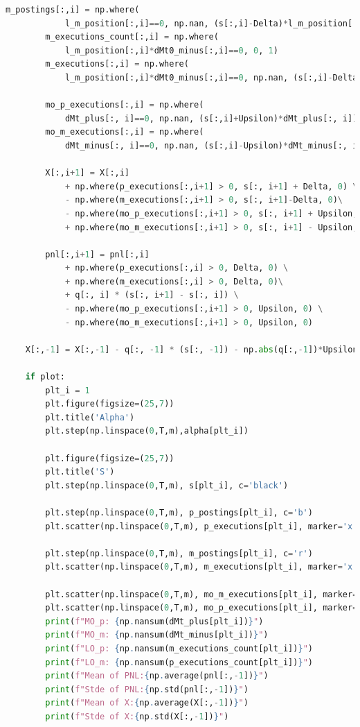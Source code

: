 \documentclass[12pt,a4paper,spanish]{article}%
\begin{document}
\begin{appendices}
\begin{lstlisting}[language=Python]
        m_postings[:,i] = np.where(
        	l_m_position[:,i]==0, np.nan, (s[:,i]-Delta)*l_m_position[:,i])
        m_executions_count[:,i] = np.where(
        	l_m_position[:,i]*dMt0_minus[:,i]==0, 0, 1)
        m_executions[:,i] = np.where(
        	l_m_position[:,i]*dMt0_minus[:,i]==0, np.nan, (s[:,i]-Delta)*l_m_position[:,i]*np.where(dMt0_minus[:,i]>0,1,0))

        mo_p_executions[:,i] = np.where(
        	dMt_plus[:, i]==0, np.nan, (s[:,i]+Upsilon)*dMt_plus[:, i])
        mo_m_executions[:,i] = np.where(
        	dMt_minus[:, i]==0, np.nan, (s[:,i]-Upsilon)*dMt_minus[:, i])

        X[:,i+1] = X[:,i] 
        	+ np.where(p_executions[:,i+1] > 0, s[:, i+1] + Delta, 0) \
        	- np.where(m_executions[:,i+1] > 0, s[:, i+1]-Delta, 0)\
            - np.where(mo_p_executions[:,i+1] > 0, s[:, i+1] + Upsilon, 0) \
            + np.where(mo_m_executions[:,i+1] > 0, s[:, i+1] - Upsilon, 0)

        pnl[:,i+1] = pnl[:,i] 
        	+ np.where(p_executions[:,i] > 0, Delta, 0) \
        	+ np.where(m_executions[:,i] > 0, Delta, 0)\
            + q[:, i] * (s[:, i+1] - s[:, i]) \
            - np.where(mo_p_executions[:,i+1] > 0, Upsilon, 0) \
            - np.where(mo_m_executions[:,i+1] > 0, Upsilon, 0)
        
    X[:,-1] = X[:,-1] - q[:, -1] * (s[:, -1]) - np.abs(q[:,-1])*Upsilon

    if plot:
        plt_i = 1
        plt.figure(figsize=(25,7))
        plt.title('Alpha')
        plt.step(np.linspace(0,T,m),alpha[plt_i])

        plt.figure(figsize=(25,7))
        plt.title('S')
        plt.step(np.linspace(0,T,m), s[plt_i], c='black')
        
        plt.step(np.linspace(0,T,m), p_postings[plt_i], c='b')
        plt.scatter(np.linspace(0,T,m), p_executions[plt_i], marker='x', c='b')

        plt.step(np.linspace(0,T,m), m_postings[plt_i], c='r')
        plt.scatter(np.linspace(0,T,m), m_executions[plt_i], marker='x', c='r')

        plt.scatter(np.linspace(0,T,m), mo_m_executions[plt_i], marker='s', c='b')
        plt.scatter(np.linspace(0,T,m), mo_p_executions[plt_i], marker='s', c='r')
        print(f"MO_p: {np.nansum(dMt_plus[plt_i])}")
        print(f"MO_m: {np.nansum(dMt_minus[plt_i])}")
        print(f"LO_p: {np.nansum(m_executions_count[plt_i])}")
        print(f"LO_m: {np.nansum(p_executions_count[plt_i])}")
        print(f"Mean of PNL:{np.average(pnl[:,-1])}")
        print(f"Stde of PNL:{np.std(pnl[:,-1])}")
        print(f"Mean of X:{np.average(X[:,-1])}")
        print(f"Stde of X:{np.std(X[:,-1])}")


\end{lstlisting}
\end{appendices}
\end{document}
